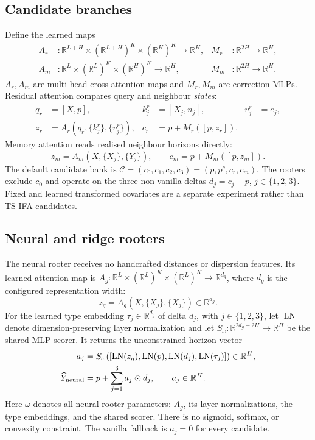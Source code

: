 \documentclass[10pt]{article}
\newcommand{\reals}{\mathbb{R}}
\begin{document}
\subsection{Candidate branches}

Define the learned maps
\begin{align*}
 A_r&:\reals^{L+H}\times(\reals^{L+H})^K\times(\reals^H)^K\to\reals^H,
 &M_r&:\reals^{2H}\to\reals^H,\\
 A_m&:\reals^L\times(\reals^L)^K\times(\reals^H)^K\to\reals^H,
 &M_m&:\reals^{2H}\to\reals^H.
\end{align*}
$A_r,A_m$ are multi-head cross-attention maps and $M_r,M_m$ are correction
MLPs. Residual attention compares query and neighbour \emph{states}:
\begin{align}
 q_r&=[X,p],& k_j^r&=[X_j,n_j],& v_j^r&=e_j,\\
 z_r&=A_r(q_r,\{k_j^r\},\{v_j^r\}),&
 c_r&=p+M_r([p,z_r]).
\end{align}
Memory attention reads realised neighbour horizons directly:
\[
 z_m=A_m(X,\{X_j\},\{Y_j\}),
 \qquad c_m=p+M_m([p,z_m]).
\]
The default candidate bank is
$\mathcal C=(c_0,c_1,c_2,c_3)=(p,p^c,c_r,c_m)$.
The rooters exclude $c_0$ and operate on the three non-vanilla deltas
$d_j=c_j-p$, $j\in\{1,2,3\}$. Fixed and learned transformed covariates are a
separate experiment rather than TS-IFA candidates.

\subsection{Neural and ridge rooters}

The neural rooter receives no handcrafted distances or dispersion features.
Its learned attention map is
$A_g:\reals^L\times(\reals^L)^K\times(\reals^L)^K\to\reals^{d_g}$,
where $d_g$ is the configured representation width:
\[
 z_g=A_g(X,\{X_j\},\{X_j\})\in\reals^{d_g}.
\]
For the learned type embedding $\tau_j\in\reals^{d_g}$ of delta $d_j$,
with $j\in\{1,2,3\}$,
let $\operatorname{LN}$ denote dimension-preserving layer normalization and
let $S_\omega:\reals^{2d_g+2H}\to\reals^H$ be the shared MLP scorer. It returns
the unconstrained horizon vector
\begin{align}
 a_j&=S_\omega\!\left([
 \operatorname{LN}(z_g),\operatorname{LN}(p),
 \operatorname{LN}(d_j),\operatorname{LN}(\tau_j)
 ]\right)\in\reals^H,\\
 \widehat Y_{\rm neural}&=p+\sum_{j=1}^{3}a_j\odot d_j,
 \qquad a_j\in\reals^H.
\end{align}
Here $\omega$ denotes all neural-rooter parameters: $A_g$, its layer
normalizations, the type embeddings, and the shared scorer.
There is no sigmoid, softmax, or convexity constraint. The vanilla fallback is
$a_j=0$ for every candidate.
\end{document}
